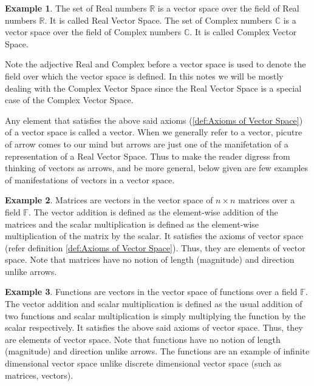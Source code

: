 \documentclass[12pt, oneside]{book}
\theoremstyle{definition}
\theoremstyle{definition}
\newtheorem{example}{Example}[section]
\theoremstyle{remark}
\begin{document}
\begin{example}
    The set of Real numbers $\mathbb{R}$ is a vector space over the field of Real numbers $\mathbb{R}$. It is called Real Vector Space.
    The set of Complex numbers $\mathbb{C}$ is a vector space over the field of Complex numbers $\mathbb{C}$. It is called Complex 
    Vector Space.
\end{example}
Note the adjective Real and Complex before a vector space is used to denote the field over which the vector space is defined.
In this notes we will be mostly dealing with the Complex Vector Space since the Real Vector Space is a special case of the Complex Vector Space.

Any element that satisfies the above said axioms (\ref{def:Axioms of Vector Space}) of a vector space is called a vector. When we generally refer to a vector, picutre of arrow comes to our mind but
arrows are just one of the manifetation of a representation of a Real Vector Space. Thus to make the reader digress from thinking of vectors as arrows, and be more general, 
below given are few examples of manifestations of vectors in a vector space.

\begin{example}
    Matrices are vectors in the vector space of $n\times n$ matrices over a field $\mathbb{F}$. The vector addition is defined as the element-wise addition of the matrices and the scalar multiplication
    is defined as the element-wise multiplication of the matrix by the scalar. It satisfies the axioms of vector space (refer definition \ref{def:Axioms of Vector Space}).
    Thus, they are elements of vector space. Note that matrices have no notion of length (magnitude) and direction unlike arrows.
\end{example}

\begin{example}
    Functions are vectors in the vector space of functions over a field $\mathbb{F}$. The vector addition and scalar multiplication is defined as the usual addition of two functions
    and scalar multiplication is simply multiplying the function by the scalar respectively. It satisfies the above said axioms of vector space.
    Thus, they are elements of vector space. Note that functions have no notion of length (magnitude) and direction unlike arrows. The functions are an example of infinite 
    dimensional vector space unlike discrete dimensional vector space (such as matrices, vectors).
\end{example}
\end{document}
